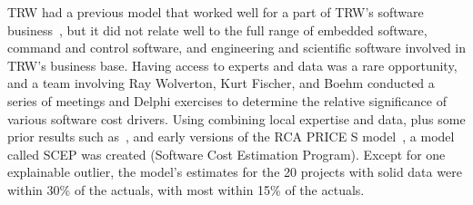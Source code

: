 \documentclass{sig-alternate}
\begin{document}
TRW had a previous model that worked well for a part
of TRW’s software business~\cite{wol74}, but it
did not relate well to the full range of embedded
software, command and control software, and
engineering and scientific software involved in
TRW’s business base.  Having access to experts and
data was a rare opportunity, and a team involving
Ray Wolverton, Kurt Fischer, and Boehm conducted a
series of meetings and Delphi exercises to determine
the relative significance of various software cost
drivers. Using combining local expertise  and data, plus some prior results 
such as~\cite{putnam76,black77,herd77,watson77},  and early versions of the RCA
PRICE S model~\cite{frei79}, a model called SCEP was created (Software Cost
Estimation Program).
Except for
one explainable outlier, the model’s estimates for
the 20 projects with solid data were within 30\% of
the actuals, with most within 15\% of the actuals.





\end{document}
